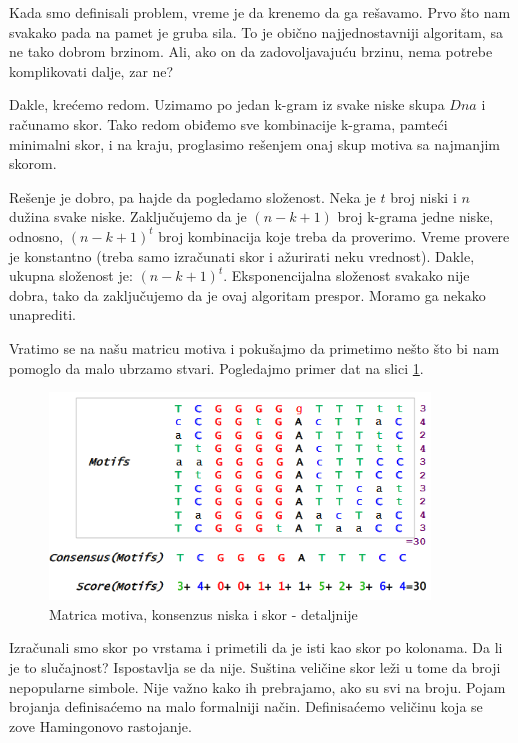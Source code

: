 Kada smo definisali problem, vreme je da krenemo da ga rešavamo.
Prvo što nam svakako pada na pamet je gruba sila. To je obično najjednostavniji algoritam, sa ne tako dobrom brzinom. Ali, ako on da zadovoljavajuću brzinu, nema potrebe komplikovati dalje, zar ne?

Dakle, krećemo redom. Uzimamo po jedan k-gram iz svake niske skupa $Dna$ i računamo skor. Tako redom obiđemo sve kombinacije k-grama, pamteći minimalni skor, i na kraju, proglasimo rešenjem onaj skup motiva sa najmanjim skorom.

Rešenje je dobro, pa hajde da pogledamo složenost. Neka je $t$ broj niski i $n$ dužina svake niske. Zaključujemo da je $(n-k+1)$ broj k-grama jedne niske, odnosno, 
$(n-k+1)^t$ broj kombinacija koje treba da proverimo. Vreme provere je konstantno (treba samo izračunati skor i ažurirati neku vrednost). Dakle, ukupna složenost je:
$(n-k+1)^t$. Eksponencijalna složenost svakako nije dobra, tako da zaključujemo da je ovaj algoritam prespor. Moramo ga nekako unaprediti.

Vratimo se na našu matricu motiva i pokušajmo da primetimo nešto što bi nam pomoglo da malo ubrzamo stvari. Pogledajmo primer dat na slici \ref{slika: motivi detaljnije}.

\begin{figure}[h]
\centering
\includegraphics[width=0.9\textwidth]{poglavlja/2/slike/32.PNG}
\caption{Matrica motiva, konsenzus niska i skor - detaljnije}
\label{slika: motivi detaljnije}
\end{figure}


Izračunali smo skor po vrstama i primetili da je isti kao skor po kolonama. Da li je to slučajnost? Ispostavlja se da nije. Suština veličine skor leži u tome da broji nepopularne simbole. Nije važno kako ih prebrajamo, ako su svi na broju. 
Pojam brojanja definisaćemo na malo formalniji način. Definisaćemo veličinu koja se zove Hamingonovo rastojanje.

